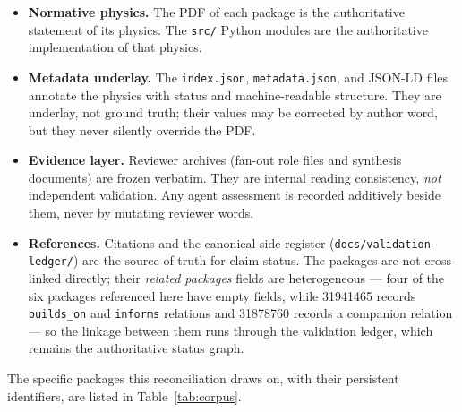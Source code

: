 \documentclass[11pt,a4paper]{article}
\begin{document}
\begin{itemize}
\item \textbf{Normative physics.} The PDF of each package is the authoritative statement of its physics. The \texttt{src/} Python modules are the authoritative implementation of that physics.
\item \textbf{Metadata underlay.} The \texttt{index.json}, \texttt{metadata.json}, and JSON-LD files annotate the physics with status and machine-readable structure. They are underlay, not ground truth; their values may be corrected by author word, but they never silently override the PDF.
\item \textbf{Evidence layer.} Reviewer archives (fan-out role files and synthesis documents) are frozen verbatim. They are internal reading consistency, \emph{not} independent validation. Any agent assessment is recorded additively beside them, never by mutating reviewer words.
\item \textbf{References.} Citations and the canonical side register (\texttt{docs/validation-ledger/}) are the source of truth for claim status. The packages are not cross-linked directly; their \emph{related packages} fields are heterogeneous --- four of the six packages referenced here have empty fields, while 31941465 records \texttt{builds\_on} and \texttt{informs} relations and 31878760 records a companion relation --- so the linkage between them runs through the validation ledger, which remains the authoritative status graph.
\end{itemize}

The specific packages this reconciliation draws on, with their persistent identifiers, are listed in Table~\ref{tab:corpus}.
\end{document}
